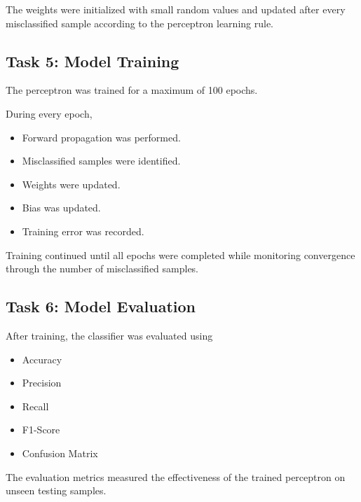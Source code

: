 \documentclass[11pt,a4paper]{article}
\begin{document}
The weights were initialized with small random values and updated after every misclassified sample according to the perceptron learning rule.



\subsection*{Task 5: Model Training}

The perceptron was trained for a maximum of 100 epochs.

During every epoch,

\begin{itemize}
\item Forward propagation was performed.
\item Misclassified samples were identified.
\item Weights were updated.
\item Bias was updated.
\item Training error was recorded.
\end{itemize}

Training continued until all epochs were completed while monitoring convergence through the number of misclassified samples.



\subsection*{Task 6: Model Evaluation}

After training, the classifier was evaluated using

\begin{itemize}
\item Accuracy
\item Precision
\item Recall
\item F1-Score
\item Confusion Matrix
\end{itemize}

The evaluation metrics measured the effectiveness of the trained perceptron on unseen testing samples.


 


\end{document}
